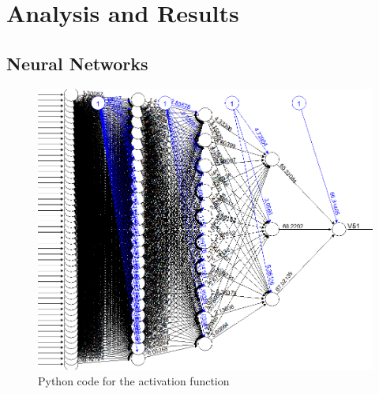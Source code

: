 \chapter{Analysis and Results}

\section{Neural Networks}
\begin{figure} %
    \includegraphics[scale=0.5]{figures/net.png}
    \caption{Python code for the activation function}
    \label{pyact}
\end{figure}